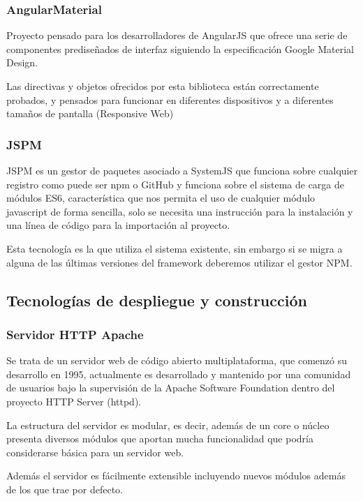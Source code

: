 \subsubsection{AngularMaterial}

Proyecto pensado para los desarrolladores de AngularJS que ofrece una serie de componentes prediseñados de interfaz siguiendo la especificación Google Material Design.

Las directivas y objetos ofrecidos por esta biblioteca están correctamente probados, y pensados para funcionar en diferentes dispositivos y a diferentes tamaños de pantalla (Responsive Web)

\subsubsection{JSPM}

JSPM es un gestor de paquetes asociado a SystemJS que funciona sobre cualquier registro como puede ser npm o GitHub y funciona sobre el sistema de carga de módulos ES6, característica que nos permita el uso de cualquier módulo javascript de forma sencilla, solo se necesita una instrucción para la instalación y una línea de código para la importación al proyecto.

Esta tecnología es la que utiliza el sistema existente, sin embargo si se migra a alguna de las últimas versiones del framework deberemos utilizar el gestor NPM.

\subsection{Tecnologías de despliegue y construcción}

\subsubsection{Servidor HTTP Apache}

Se trata de un servidor web de código abierto multiplataforma, que comenzó su desarrollo en 1995, actualmente es desarrollado y mantenido por una comunidad de usuarios bajo la supervisión de la Apache Software Foundation dentro del proyecto HTTP Server (httpd).

La estructura del servidor es modular, es decir, además de un core o núcleo presenta diversos módulos que aportan mucha funcionalidad que podría considerarse básica para un servidor web.

Además el servidor es fácilmente extensible incluyendo nuevos módulos además de los que trae por defecto.

